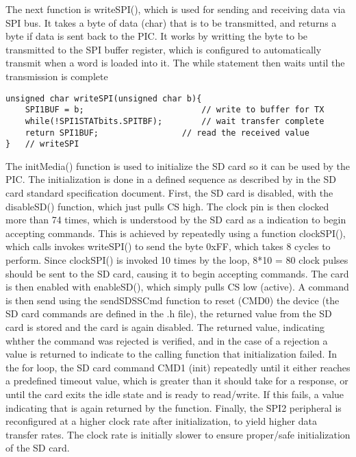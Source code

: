 \documentclass[12pt]{article}
\begin{document}
The next function is writeSPI(), which is used for sending and receiving data via SPI bus. It takes a byte of data (char) that is to be transmitted, and returns a byte if data is sent back to the PIC. It works by writting the byte to be transmitted to the SPI buffer register, which is configured to automatically transmit when a word is loaded into it. The while statement then waits until the transmission is complete 
\begin{lstlisting}
unsigned char writeSPI(unsigned char b){
	SPI1BUF = b;						// write to buffer for TX
	while(!SPI1STATbits.SPITBF);		// wait transfer complete
	return SPI1BUF;					// read the received value
}	// writeSPI

\end{lstlisting}
The initMedia() function is used to initialize the SD card so it can be used by the PIC. The initialization is done in a defined sequence as described by in the SD card standard specification document. First, the SD card is disabled, with the disableSD() function, which just pulls CS high. The clock pin is then clocked more than 74 times, which is understood by the SD card as a indication to begin accepting commands. This is achieved by repeatedly using a function clockSPI(), which calls invokes writeSPI() to send the byte 0xFF, which takes 8 cycles to perform. Since clockSPI() is invoked 10 times by the loop, 8*10 = 80 clock pulses should be sent to the SD card, causing it to begin accepting commands. The card is then enabled with enableSD(), which simply pulls CS low (active). A command is then send using the sendSDSSCmd function to reset (CMD0) the device (the SD card commands are defined in the .h file), the returned value from the SD card is stored and the card is again disabled. The returned value, indicating whther the command was rejected is verified, and in the case of a rejection a value is returned to indicate to the calling function that initialization failed. In the for loop, the SD card command CMD1 (init) repeatedly until it either reaches a predefined timeout value, which is greater than it should take for a response, or until the card exits the idle state and is ready to read/write. If this fails, a value indicating that is again returned by the function. Finally, the SPI2 peripheral is reconfigured at a higher clock rate after initialization, to yield higher data transfer rates. The clock rate is initially slower to ensure proper/safe initialization of the SD card.
\end{document}
